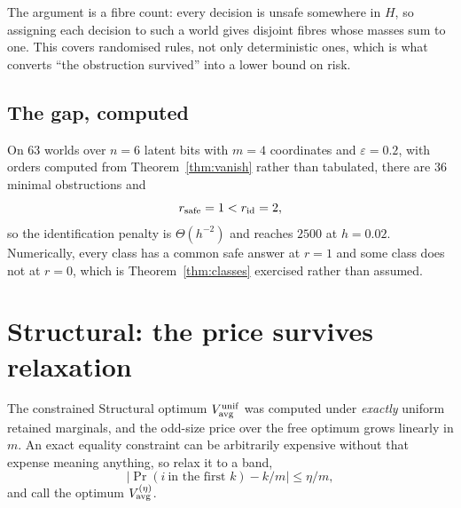 
The argument is a fibre count: every decision is unsafe somewhere in $H$, so assigning each
decision to such a world gives disjoint fibres whose masses sum to one. This covers
randomised rules, not only deterministic ones, which is what converts ``the obstruction
survived'' into a lower bound on risk.

\subsection{The gap, computed}

On $63$ worlds over $n=6$ latent bits with $m=4$ coordinates and $\varepsilon=0.2$, with
orders computed from Theorem~\ref{thm:vanish} rather than tabulated, there are $36$ minimal
obstructions and
\begin{equation}
r_{\rm safe}=1<r_{\rm id}=2 ,
\label{eq:gapcomputed}
\end{equation}
so the identification penalty is $\Theta(h^{-2})$ and reaches $2500$ at $h=0.02$. \NUM{}
Numerically, every class has a common safe answer at $r=1$ and some class does not at
$r=0$, which is Theorem~\ref{thm:classes} exercised rather than assumed.


\section{Structural: the price survives relaxation}
\label{sec:structural}

The constrained Structural optimum $V^{\rm unif}_{\rm avg}$ was computed under
\emph{exactly} uniform retained marginals, and the odd-size price over the free optimum
grows linearly in $m$. An exact equality constraint can be arbitrarily expensive without
that expense meaning anything, so relax it to a band,
\begin{equation}
\bigl|\Pr(i\ \text{in the first }k)-k/m\bigr|\le\eta/m ,
\label{eq:band}
\end{equation}
and call the optimum $V^{(\eta)}_{\rm avg}$.

